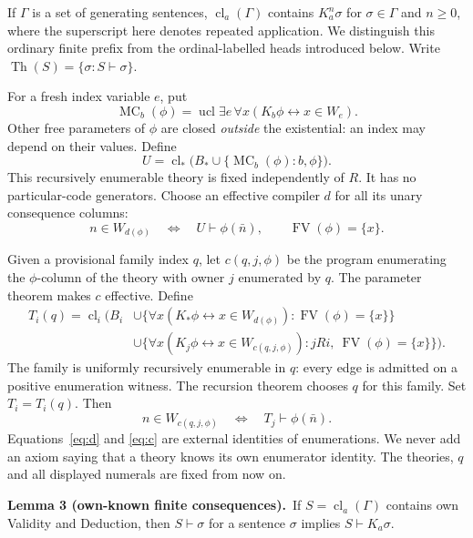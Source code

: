 \documentclass[11pt]{article}
\newcommand{\Th}{\operatorname{Th}}
\newcommand{\FV}{\operatorname{FV}}
\newcommand{\ucl}{\operatorname{ucl}}
\newcommand{\cl}{\operatorname{cl}}
\newcommand{\MC}{\operatorname{MC}}
\newcommand{\statement}[2]{\par\textbf{#1.}\ #2\par}
\begin{document}
If $\Gamma$ is a set of generating sentences, $\cl_a(\Gamma)$ contains
$K_a^n\sigma$ for $\sigma\in\Gamma$ and $n\ge0$, where the superscript
here denotes repeated application. We distinguish this ordinary finite
prefix from the ordinal-labelled heads introduced below. Write
$\Th(S)=\{\sigma:S\vdash\sigma\}$.

For a fresh index variable $e$, put
\[
  \MC_b(\phi)=\ucl\exists e\,\forall x
     (K_b\phi\leftrightarrow x\in W_e).
\]
Other free parameters of $\phi$ are closed \emph{outside} the
existential: an index may depend on their values. Define
\begin{equation}\label{eq:core}
 U=\cl_*\bigl(B_*\cup\{\MC_b(\phi):b,\phi\}\bigr).
\end{equation}
This recursively enumerable theory is fixed independently of $R$.
It has no particular-code generators. Choose an effective compiler
$d$ for all its unary consequence columns:
\begin{equation}\label{eq:d}
 n\in W_{d(\phi)}\quad\Longleftrightarrow\quad U\vdash\phi(\bar n),
 \qquad \FV(\phi)=\{x\}.
\end{equation}

Given a provisional family index $q$, let $c(q,j,\phi)$ be the program
enumerating the $\phi$-column of the theory with owner $j$ enumerated by
$q$. The parameter theorem makes $c$ effective. Define
\begin{equation}\label{eq:extensions}
\begin{split}
 T_i(q)=\cl_i\bigl(B_i
 &\cup\{\forall x(K_*\phi\leftrightarrow x\in W_{d(\phi)}):\FV(\phi)=\{x\}\}\\
 &\cup\{\forall x(K_j\phi\leftrightarrow x\in W_{c(q,j,\phi)}):
                   jRi,\ \FV(\phi)=\{x\}\}\bigr).
\end{split}
\end{equation}
The family is uniformly recursively enumerable in $q$: every edge is
admitted on a positive enumeration witness. The recursion theorem
chooses $q$ for this family. Set $T_i=T_i(q)$. Then
\begin{equation}\label{eq:c}
 n\in W_{c(q,j,\phi)}\quad\Longleftrightarrow\quad T_j\vdash\phi(\bar n).
\end{equation}
Equations~\eqref{eq:d} and \eqref{eq:c} are external identities of
enumerations. We never add an axiom saying that a theory knows its own
enumerator identity. The theories, $q$ and all displayed numerals are
fixed from now on.

\statement{Lemma 3 (own-known finite consequences)}{If
$S=\cl_a(\Gamma)$ contains own Validity and Deduction, then
$S\vdash\sigma$ for a sentence $\sigma$ implies $S\vdash K_a\sigma$.}
\end{document}

